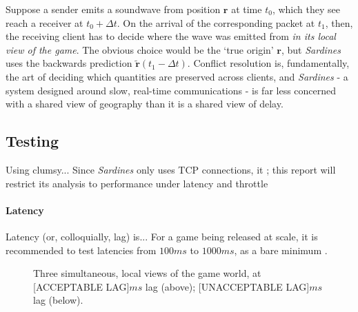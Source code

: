 \documentclass[a4paper, 9pt]{article}
\begin{document}
\begin{flushleft}
\vspace{5pt}\noindent
Suppose a sender emits a soundwave from position $\mathbf{r}$ at time $t_0$, which they see reach a receiver at $t_0+\Delta t$. On the arrival of the corresponding packet at $t_1$, then, the receiving client has to decide where the wave was emitted from \textit{in its local view of the game}. The obvious choice would be the `true origin' $\mathbf{r}$, but \textit{Sardines} uses the backwards prediction $\mathbf{\tilde{r}}(t_1-\Delta t)$. Conflict resolution is, fundamentally, the art of deciding which quantities are preserved across clients, and \textit{Sardines} - a system designed around slow, real-time communications - is far less concerned with a shared view of geography than it is a shared view of delay.

\pagebreak
\subsection*{Testing}\label{Testing}

\vspace{5pt}
Using clumsy...
Since \textit{Sardines} only uses TCP connections, it ; this report will restrict its analysis to performance under latency and throttle

\paragraph{Latency} Latency (or, colloquially, lag) is...
For a game being released at scale, it is recommended to test latencies from $100ms$ to $1000ms$, as a bare minimum \citep{unityNTWK}.

\vspace{5pt}

\begin{figure}[h]
\centering
\caption{Three simultaneous, local views of the game world, at [ACCEPTABLE LAG]$ms$ lag (above); [UNACCEPTABLE LAG]$ms$ lag (below).}
\label{Lag Testing}
\end{figure}

\vspace{5pt}%


\end{flushleft}
\end{document}
